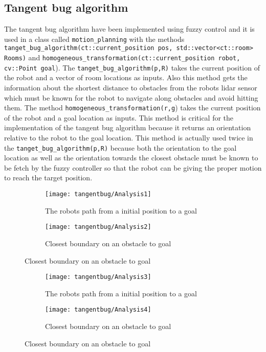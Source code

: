\documentclass[../Head/Main.tex]{subfiles}
\begin{document}
\subsection{Tangent bug algorithm}
\label{subsec:tangentBug}

The tangent bug algorithm have been implemented using fuzzy control and it is used in a class called \texttt{motion\_planning} with the methods \texttt{tanget\_bug\_algorithm(ct::current\_position pos, std::vector<ct::room> Rooms)} and \texttt{homogeneous\_transformation(ct::current\_position robot, cv::Point goal}). The \texttt{tanget\_bug\_algorithm(p,R)} takes the current position of the robot and a vector of room locations as inputs. Also this method gets the information about the shortest distance to obstacles from the robots lidar sensor which must be known for the robot to navigate along obstacles and avoid hitting them. The method \texttt{homogeneous\_transformation(r,g}) takes the current position of the robot and a goal location as inputs. This method is critical for the implementation of the tangent bug algorithm because it returns an orientation relative to the robot to the goal location. This method is actually used twice in the \texttt{tanget\_bug\_algorithm(p,R)} because both the orientation to the goal location as well as the orientation towards the closest obstacle must be known to be fetch by the fuzzy controller so that the robot can be giving the proper motion to reach the target position. 


\begin{figure}[H]
  \begin{subfigure}[b]{0.59\textwidth}
    \centering
    \texttt{[image: tangentbug/Analysis1]}
    \caption{The robots path from a initial position to a goal}
    \label{fig:tangentBugRobotPath1}
  \end{subfigure}
  \hfill
   \begin{subfigure}[b]{0.39\textwidth}
    \centering
    \texttt{[image: tangentbug/Analysis2]}
    \caption{Closest boundary on an obstacle to goal}
    \label{fig:closestBoundaryOnObstacle1}
  \end{subfigure}
  \end{figure}
  
\begin{figure}[H]
  \begin{subfigure}[b]{0.59\textwidth}
    \centering
    \texttt{[image: tangentbug/Analysis3]}
    \caption{The robots path from a initial position to a goal}
    \label{fig:tangentBugRobotPath2}
  \end{subfigure}
  \hfill
   \begin{subfigure}[b]{0.39\textwidth}
    \centering
    \texttt{[image: tangentbug/Analysis4]}
    \caption{Closest boundary on an obstacle to goal}
    \label{fig:closestBoundaryOnObstacle2}
  \end{subfigure}
  \end{figure}
  
\end{document}
